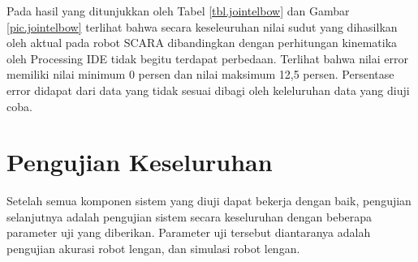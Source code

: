  Pada hasil yang ditunjukkan oleh Tabel \ref{tbl.jointelbow} dan Gambar \ref{pic.jointelbow} terlihat bahwa secara keseleuruhan nilai sudut yang dihasilkan oleh aktual pada robot SCARA dibandingkan dengan perhitungan kinematika oleh Processing IDE tidak begitu terdapat perbedaan. Terlihat bahwa nilai error
 memiliki nilai minimum 0 persen dan nilai maksimum 12,5 persen. Persentase error didapat dari data yang tidak sesuai dibagi oleh keleluruhan data yang diuji coba. 

\section{Pengujian Keseluruhan}
Setelah semua komponen sistem yang diuji dapat bekerja dengan baik, pengujian selanjutnya adalah pengujian sistem secara keseluruhan dengan beberapa parameter uji yang diberikan. Parameter uji tersebut diantaranya adalah pengujian akurasi robot lengan, dan simulasi robot lengan. 

